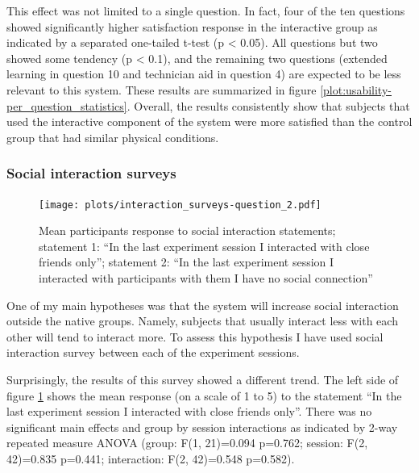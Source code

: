 \documentclass[a4paper,11pt]{article}
\begin{document}
{This effect was not limited to a single question.
In fact, four of the ten questions showed significantly higher satisfaction response in the interactive group as indicated by a separated one-tailed t-test (p \textless{} 0.05). All questions but two showed some tendency (p \textless{} 0.1), and the remaining two questions (extended learning in question 10 and technician aid in question 4) are expected to be less relevant to this system.
These results are summarized in figure \ref{plot:usability-per_question_statistics}.
Overall, the results consistently show that subjects that used the interactive component of the system were more satisfied than the control group that had similar physical conditions.

\subsubsection{Social interaction surveys}

\begin{figure}[!htb]
    \centering
    \texttt{[image: plots/interaction\_surveys-question\_2.pdf]}
    \caption{Mean participants response to social interaction statements; statement 1: ``In the last experiment session I interacted with close friends only''; statement 2: ``In the last experiment session I interacted with participants with them I have no social connection''}\label{plot:interaction_surveys-question_2}
\end{figure}

One of my main hypotheses was that the system will increase social interaction outside the native groups.
Namely, subjects that usually interact less with each other will tend to interact more.
To assess this hypothesis I have used social interaction survey between each of the experiment sessions.

Surprisingly, the results of this survey showed a different trend.
The left side of figure \ref{plot:interaction_surveys-question_2} shows the mean response (on a scale of 1 to 5) to the statement ``In the last experiment session I interacted with close friends only''.
There was no significant main effects and group by session interactions as indicated by 2-way repeated measure ANOVA (group: F(1, 21)=0.094 p=0.762; session: F(2, 42)=0.835 p=0.441; interaction: F(2, 42)=0.548 p=0.582).

}
\end{document}
